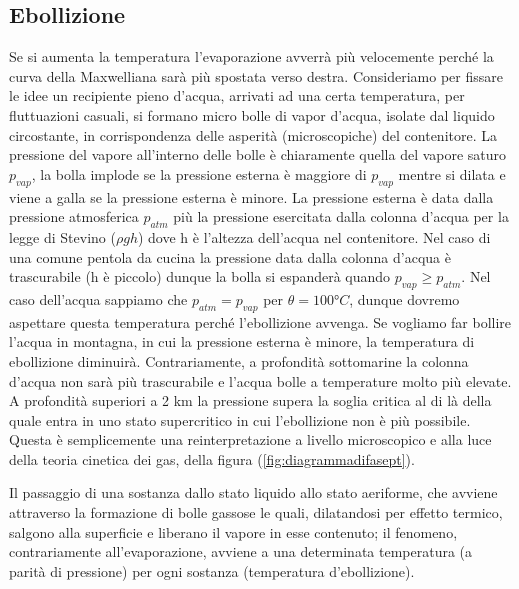 \documentclass[
10pt, %
a4paper, %
oneside, %
headinclude,footinclude, %
BCOR5mm, %
]{scrartcl}
\begin{document}
\subsection{Ebollizione}
Se si aumenta la temperatura l'evaporazione avverrà più velocemente perché la curva della Maxwelliana sarà più spostata verso destra. Consideriamo per fissare le idee un recipiente pieno d'acqua, arrivati ad una certa temperatura, per fluttuazioni casuali, si formano micro bolle di vapor d'acqua, isolate dal liquido circostante, in corrispondenza delle asperità (microscopiche) del contenitore. La pressione del vapore all'interno delle bolle è chiaramente quella del vapore saturo $p_{vap}$, la bolla implode se la pressione esterna è maggiore di $p_{vap}$ mentre si dilata e viene a galla se la pressione esterna è minore. La pressione esterna è data dalla pressione atmosferica $p_{atm}$ più la pressione esercitata dalla colonna d'acqua per la legge di Stevino ($\rho g h$) dove h è l'altezza dell'acqua nel contenitore. Nel caso di una comune pentola da cucina la pressione data dalla colonna d'acqua è trascurabile (h è piccolo) dunque la bolla si espanderà quando $p_{vap} \geq p_{atm}$. Nel caso dell'acqua sappiamo che $p_{atm} = p_{vap}$ per $\theta = 100 °C$, dunque dovremo aspettare questa temperatura perché l'ebollizione avvenga. Se vogliamo far bollire l'acqua in montagna, in cui la pressione esterna è minore, la temperatura di ebollizione diminuirà. Contrariamente, a profondità sottomarine la colonna d'acqua non sarà più trascurabile e l'acqua bolle a temperature molto più elevate. A profondità superiori a 2 km la pressione supera la soglia critica al di là della quale entra in uno stato supercritico in cui l'ebollizione non è più possibile. Questa è semplicemente una reinterpretazione a livello microscopico e alla luce della teoria cinetica dei gas, della figura (\ref{fig:diagrammadifasept}). 
\begin{definition}[Ebollizione]
	Il passaggio di una sostanza dallo stato liquido allo stato aeriforme, che avviene attraverso la formazione di bolle gassose le quali, dilatandosi per effetto termico, salgono alla superficie e liberano il vapore in esse contenuto; il fenomeno, contrariamente all'evaporazione, avviene a una determinata temperatura (a parità di pressione) per ogni sostanza (temperatura d'ebollizione).
\end{definition}
\end{document}
